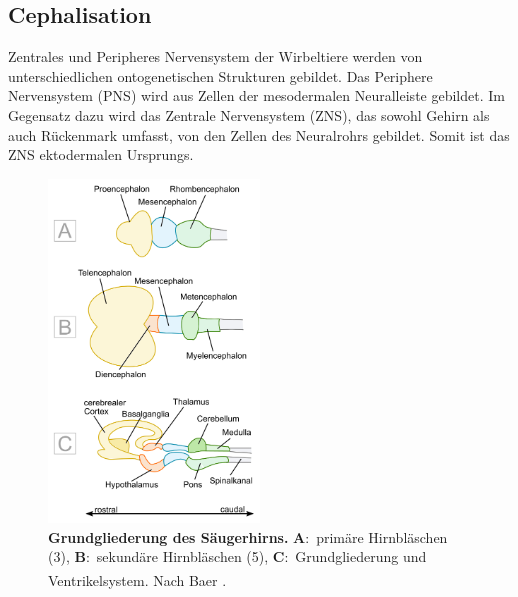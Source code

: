 \documentclass[12pt,a4paper,pdftex]{article}
\begin{document}
\subsection{Cephalisation}
\label{subsec:Cephalisation} 
Zentrales und Peripheres Nervensystem der Wirbeltiere werden von unterschiedlichen ontogenetischen Strukturen gebildet. Das Periphere Nervensystem (PNS) wird aus Zellen der mesodermalen Neuralleiste gebildet. Im Gegensatz dazu wird das Zentrale Nervensystem (ZNS), das sowohl Gehirn als auch Rückenmark umfasst, von den Zellen des Neuralrohrs gebildet. Somit ist das ZNS ektodermalen Ursprungs. \\

\begin{figure}[H]
\centering
\includegraphics[width=0.5\textwidth]{pictures/Bilder_Jule/Andere/cephalisation.png}
\caption[Grundgliederung des Säugerhirns]{\textbf{Grundgliederung des Säugerhirns.} \textbf{A}:~primäre Hirnbläschen (3), \textbf{B}:~sekundäre Hirnbläschen (5), \textbf{C}:~Grundgliederung und Ventrikelsystem. Nach Baer \textsuperscript{\cite[7]{neurowissenschaften_baer}}.}
\label{fig:cephalisation}
\end{figure}
\end{document}
